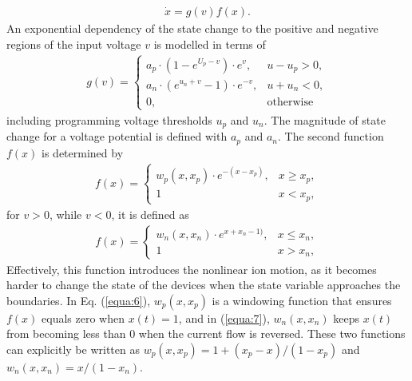 \documentclass[10pt]{article}
\begin{document}
\begin{multicols}{2}
        \begin{align}
            \dot{x} = g(v)f(x). \label{equa:4}
        \end{align}
        An exponential dependency of the state change to the positive and negative regions of the input voltage $v$ is modelled in terms of
        \begin{align}
            g(v) = \begin{cases}
                       a_p \cdot (1-e^{U_p -v}) \cdot e^v, &u-u_p > 0, \\ a_n \cdot (e^{u_n +v}-1)\cdot e^{-v}, &u+u_n < 0, \\
                       0, &\text{otherwise}
            \end{cases} \label{equa:5}
        \end{align}
        including programming voltage thresholds $u_p$ and $u_n$. The magnitude of state change for a voltage potential is defined with $a_p$ and $a_n$. The second function $f(x)$ is determined by
        \begin{align}
            f(x) = \begin{cases}
                       w_p (x, x_p) \cdot e^{-(x-x_p)} , &x \ge x_p, \\
                       1 &x < x_p,
            \end{cases} \label{equa:6}
        \end{align}
        for $v > 0$, while $v < 0$, it is defined as
        \begin{align}
            f(x) = \begin{cases}
                       w_n (x, x_n) \cdot e^{x+x_n-1)} , &x \le x_n, \\
                       1 &x > x_n,
            \end{cases} \label{equa:7}
        \end{align}
        Effectively, this function introduces the nonlinear ion motion, as it becomes harder to change the state of the devices when the state variable approaches the boundaries. In Eq. (\ref{equa:6}), $w_p(x, x_p)$ is a windowing function that ensures $f(x)$ equals zero when $x(t) = 1$, and in (\ref{equa:7}), $w_n(x, x_n)$ keeps $x(t)$ from becoming less than $0$ when the current flow is reversed. These two functions can explicitly be written as $w_p(x, x_p) = 1 + (x_p - x)/( 1 - x_p)$ and $w_n(x, x_n) = x/(1 - x_n)$. \par

\end{multicols}
\end{document}
